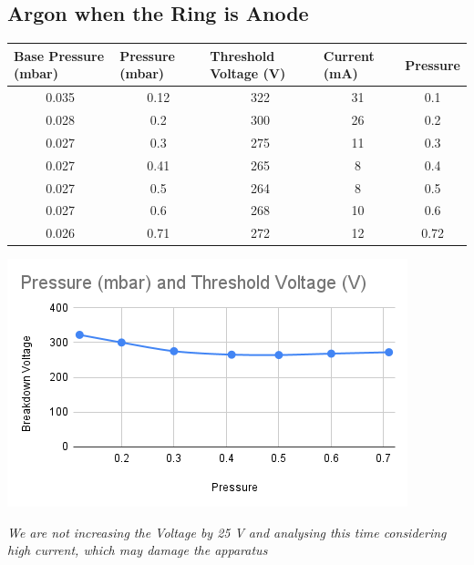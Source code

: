 \documentclass[]{report}[12 pt]
\begin{document}
\subsection{Argon when the Ring is Anode}
\begin{center}
\begin{tabular}{|c|c|c|c|c|}
	\hline
	\multicolumn{1}{|l|}{Base Pressure (mbar)} & \multicolumn{1}{l|}{Pressure (mbar)} & \multicolumn{1}{l|}{Threshold Voltage (V)} & \multicolumn{1}{l|}{Current (mA)} & \multicolumn{1}{l|}{Pressure} \\ \hline
	0.035                                      & 0.12                                 & 322                                        & 31                                & 0.1                           \\ \hline
	0.028                                      & 0.2                                  & 300                                        & 26                                & 0.2                           \\ \hline
	0.027                                      & 0.3                                  & 275                                        & 11                                & 0.3                           \\ \hline
	0.027                                      & 0.41                                 & 265                                        & 8                                 & 0.4                           \\ \hline
	0.027                                      & 0.5                                  & 264                                        & 8                                 & 0.5                           \\ \hline
	0.027                                      & 0.6                                  & 268                                        & 10                                & 0.6                           \\ \hline
	0.026                                      & 0.71                                 & 272                                        & 12                                & 0.72                          \\ \hline
\end{tabular}
	\includegraphics[width=10 cm]{plasma2.png}
\end{center}
\textit{ We are not increasing the Voltage by 25 V and analysing this time considering high current, which may damage the apparatus}
	
\end{document}

